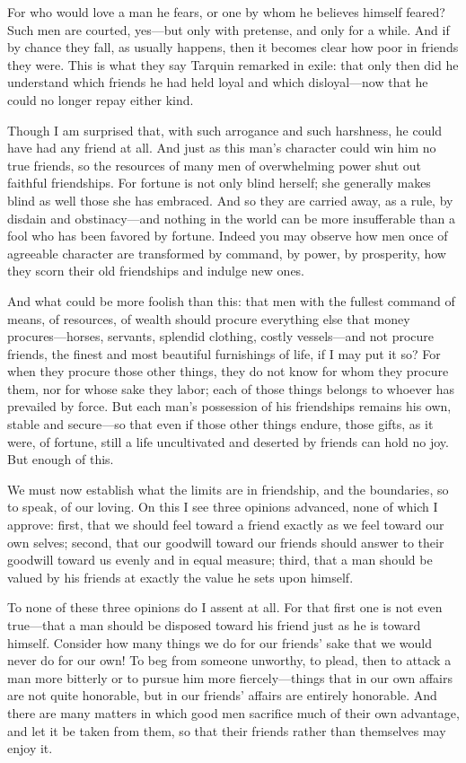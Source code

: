  For who would love a man he fears, or one by whom he believes himself feared? Such men are courted, yes—but only with pretense, and only for a while. And if by chance they fall, as usually happens, then it becomes clear how poor in friends they were. This is what they say Tarquin remarked in exile: that only then did he understand which friends he had held loyal and which disloyal—now that he could no longer repay either kind.

 Though I am surprised that, with such arrogance and such harshness, he could have had any friend at all. And just as this man's character could win him no true friends, so the resources of many men of overwhelming power shut out faithful friendships. For fortune is not only blind herself; she generally makes blind as well those she has embraced. And so they are carried away, as a rule, by disdain and obstinacy—and nothing in the world can be more insufferable than a fool who has been favored by fortune. Indeed you may observe how men once of agreeable character are transformed by command, by power, by prosperity, how they scorn their old friendships and indulge new ones.

 And what could be more foolish than this: that men with the fullest command of means, of resources, of wealth should procure everything else that money procures—horses, servants, splendid clothing, costly vessels—and not procure friends, the finest and most beautiful furnishings of life, if I may put it so? For when they procure those other things, they do not know for whom they procure them, nor for whose sake they labor; each of those things belongs to whoever has prevailed by force. But each man's possession of his friendships remains his own, stable and secure—so that even if those other things endure, those gifts, as it were, of fortune, still a life uncultivated and deserted by friends can hold no joy. But enough of this.

 We must now establish what the limits are in friendship, and the boundaries, so to speak, of our loving. On this I see three opinions advanced, none of which I approve: first, that we should feel toward a friend exactly as we feel toward our own selves; second, that our goodwill toward our friends should answer to their goodwill toward us evenly and in equal measure; third, that a man should be valued by his friends at exactly the value he sets upon himself.

 To none of these three opinions do I assent at all. For that first one is not even true—that a man should be disposed toward his friend just as he is toward himself. Consider how many things we do for our friends' sake that we would never do for our own! To beg from someone unworthy, to plead, then to attack a man more bitterly or to pursue him more fiercely—things that in our own affairs are not quite honorable, but in our friends' affairs are entirely honorable. And there are many matters in which good men sacrifice much of their own advantage, and let it be taken from them, so that their friends rather than themselves may enjoy it.

